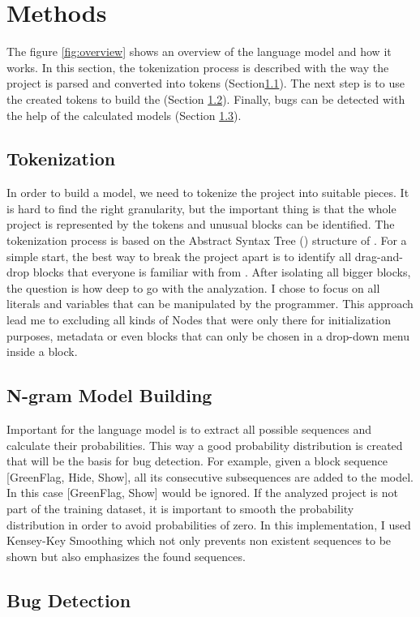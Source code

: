 \chapter{Methods}\label{chap:methods}
The figure \ref{fig:overview} shows an overview of the language model and how it works. In this section, the tokenization process is described with the way the \scratch{} project is parsed and converted into tokens (Section\ref{sec:tokenization}). The next step is to use the created tokens to build the  (Section \ref{sec:model}). Finally, bugs can be detected with the help of the calculated models (Section \ref{sec:detection}).

\section{Tokenization}\label{sec:tokenization}
In order to build a model, we need to tokenize the \scratch{} project into suitable pieces. It is hard to find the right granularity, but the important thing is that the whole project is represented by the tokens and unusual blocks can be identified. The tokenization process is based on the Abstract Syntax Tree (\AST{}) structure of \litterbox{}. For a simple start, the best way to break the project apart is to identify all drag-and-drop blocks that everyone is familiar with from \scratch{}. After isolating all bigger blocks, the question is how deep to go with the analyzation. I chose to focus on all literals and variables that can be manipulated by the \scratch{} programmer. This approach lead me to excluding all kinds of \AST{}Nodes that were only there for initialization purposes, metadata or even blocks that can only be chosen in a drop-down menu inside a block.  


\section{N-gram Model Building}\label{sec:model}
Important for the language model is to extract all possible sequences and calculate their probabilities. This way a good probability distribution is created that will be the basis for bug detection. For example, given a block sequence [GreenFlag, Hide, Show], all its consecutive subsequences are added to the model. In this case [GreenFlag, Show] would be ignored. If the analyzed project is not part of the training dataset, it is important to smooth the probability distribution in order to avoid probabilities of zero. In this implementation, I used Kensey-Key Smoothing which not only prevents non existent sequences to be shown but also emphasizes the found sequences.






\section{Bug Detection}\label{sec:detection}
